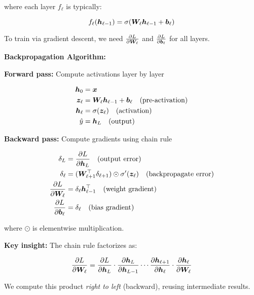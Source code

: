 where each layer $f_\ell$ is typically:

\begin{equation}
    f_\ell(\bm{h}_{\ell-1}) = \sigma(\bm{W}_\ell \bm{h}_{\ell-1} + \bm{b}_\ell)
\end{equation}

To train via gradient descent, we need $\frac{\partial L}{\partial \bm{W}_\ell}$ and $\frac{\partial L}{\partial \bm{b}_\ell}$ for all layers.

\begin{seanbox}{6.8}
\textbf{Backpropagation Algorithm:}

\textbf{Forward pass:} Compute activations layer by layer

\begin{align}
    \bm{h}_0 &= \bm{x} \\
    \bm{z}_\ell &= \bm{W}_\ell \bm{h}_{\ell-1} + \bm{b}_\ell \quad \text{(pre-activation)} \\
    \bm{h}_\ell &= \sigma(\bm{z}_\ell) \quad \text{(activation)} \\
    \hat{y} &= \bm{h}_L \quad \text{(output)}
\end{align}

\textbf{Backward pass:} Compute gradients using chain rule

\begin{align}
    \delta_L &= \frac{\partial L}{\partial \bm{h}_L} \quad \text{(output error)} \\
    \delta_\ell &= (\bm{W}_{\ell+1}^\top \delta_{\ell+1}) \odot \sigma'(\bm{z}_\ell) \quad \text{(backpropagate error)} \\
    \frac{\partial L}{\partial \bm{W}_\ell} &= \delta_\ell \bm{h}_{\ell-1}^\top \quad \text{(weight gradient)} \\
    \frac{\partial L}{\partial \bm{b}_\ell} &= \delta_\ell \quad \text{(bias gradient)}
\end{align}

where $\odot$ is elementwise multiplication.

\textbf{Key insight:} The chain rule factorizes as:

\begin{equation}
    \frac{\partial L}{\partial \bm{W}_\ell} = \frac{\partial L}{\partial \bm{h}_L} \cdot \frac{\partial \bm{h}_L}{\partial \bm{h}_{L-1}} \cdots \frac{\partial \bm{h}_{\ell+1}}{\partial \bm{h}_\ell} \cdot \frac{\partial \bm{h}_\ell}{\partial \bm{W}_\ell}
\end{equation}

We compute this product \textit{right to left} (backward), reusing intermediate results.
\end{seanbox}

